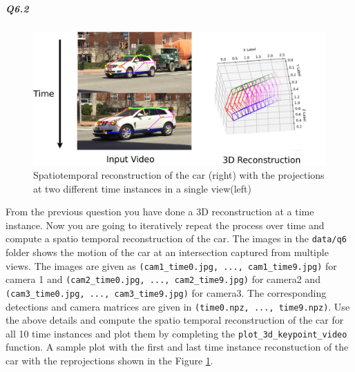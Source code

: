 \subparagraph*{Q6.2}
\begin{figure}[t]
    \centering
    \includegraphics[width=\textwidth]{images/q6/temporal_new.png}
    \caption{Spatiotemporal reconstruction of the car (right) with the projections at two different time instances in a single view(left)}
    \label{fig:q6.2}
\end{figure}
From the previous question you have done a 3D reconstruction at a time instance. Now you are going to iteratively repeat the process over time and compute a spatio temporal reconstruction of the car. The images in the \texttt{data/q6} folder shows the motion of the car at an intersection captured from multiple views. The images are given as \texttt{(cam1\_time0.jpg, ..., cam1\_time9.jpg)} for camera 1 and \texttt{(cam2\_time0.jpg, ..., cam2\_time9.jpg)} for camera2 and \texttt{(cam3\_time0.jpg, ..., cam3\_time9.jpg)} for camera3.  The corresponding detections and camera matrices are given in \texttt{(time0.npz, ..., time9.npz)}. Use the above details and compute the spatio temporal reconstruction of the car for all 10 time instances and plot them by completing the \texttt{plot\_3d\_keypoint\_video} function. A sample plot with the first and last time instance reconstuction of the car with the reprojections shown in the Figure \ref{fig:q6.2}.  


